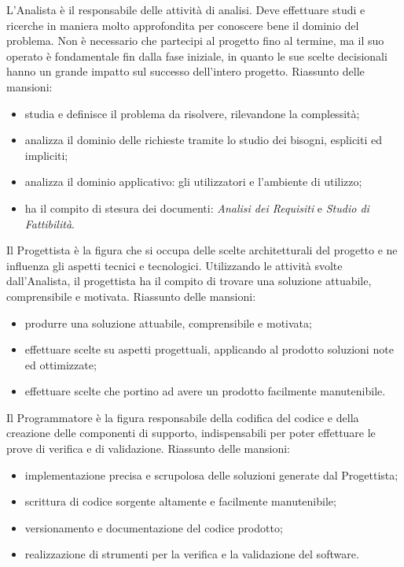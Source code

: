 			L'Analista è il responsabile delle attività di analisi. Deve effettuare studi e ricerche in maniera molto approfondita per conoscere bene il dominio del problema. Non è necessario che partecipi al progetto fino al termine, ma il suo operato è fondamentale fin dalla fase iniziale, in quanto le sue scelte decisionali hanno un grande impatto sul successo dell'intero progetto.
			Riassunto delle mansioni:
			\begin{itemize}
				\item studia e definisce il problema da risolvere, rilevandone la complessità;
				\item analizza il dominio delle richieste tramite lo studio dei bisogni, espliciti ed impliciti;
				\item analizza il dominio applicativo: gli utilizzatori e l'ambiente di utilizzo;
				\item ha il compito di stesura dei documenti: {\it Analisi dei Requisiti} e {\it Studio di Fattibilità}.
			\end{itemize}
		
			Il Progettista è la figura che si occupa delle scelte architetturali del progetto e ne influenza gli aspetti tecnici e tecnologici. Utilizzando le attività svolte dall'Analista, il progettista ha il compito di trovare una soluzione attuabile, comprensibile e motivata.
			Riassunto delle mansioni:
			\begin{itemize}
				\item produrre una soluzione attuabile, comprensibile e motivata;
				\item effettuare scelte su aspetti progettuali, applicando al prodotto soluzioni note ed ottimizzate;
				\item effettuare scelte che portino ad avere un prodotto facilmente manutenibile.
			\end{itemize}
		
			Il Programmatore è la figura responsabile della codifica del codice e della creazione delle componenti di supporto, indispensabili per poter effettuare le prove di verifica e di validazione.
			Riassunto delle mansioni:
			\begin{itemize}
				\item implementazione precisa e scrupolosa delle soluzioni generate dal Progettista;
				\item scrittura di codice sorgente altamente e facilmente manutenibile;
				\item versionamento e documentazione del codice prodotto;
				\item realizzazione di strumenti per la verifica e la validazione del software.
			\end{itemize}
		

